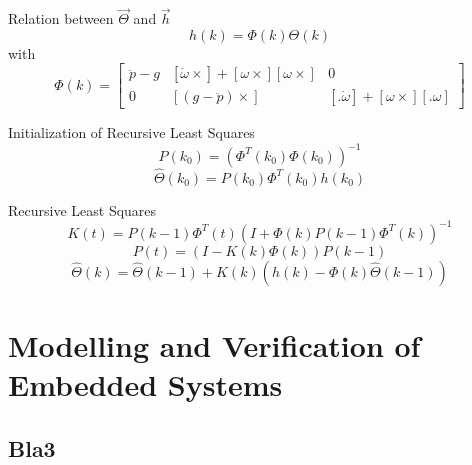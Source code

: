 Relation between $\vec{\Theta}$ and $\vec{h}$
\begin{equation}
	h(k) = \Phi(k) \Theta(k)
\end{equation}
with
\begin{equation}
	\Phi(k) = 
	\begin{bmatrix}
		\ddot p - g	& [\dot \omega \times] + [\omega \times] [\omega \times]	& 0 \\
		0			& [(g - \ddot p) \times]									& [. \dot \omega] + [\omega \times] [. \omega]
	\end{bmatrix}
\end{equation}

Initialization of Recursive Least Squares
\begin{equation}
	P(k_0) = \left( \Phi^T(k_0) \Phi(k_0) \right)^{-1}
\end{equation}
\begin{equation}
	\hat \Theta (k_0) = P(k_0) \Phi^T(k_0) h(k_0)
\end{equation}

Recursive Least Squares
\begin{equation}
	K(t) = P(k-1) \Phi^T(t) (I + \Phi(k) P(k - 1) \Phi^T(k))^{-1}
\end{equation}
\begin{equation}
	P(t) = (I - K(k) \Phi(k)) P(k - 1)
\end{equation}
\begin{equation}
	\hat \Theta(k) = \hat \Theta(k - 1) + K(k) (h(k) - \Phi(k) \hat \Theta(k - 1))
\end{equation}

\chapter{Modelling and Verification of Embedded Systems}

\section{Bla3}
\label{sec:bla3}
\lipsum[1] 
